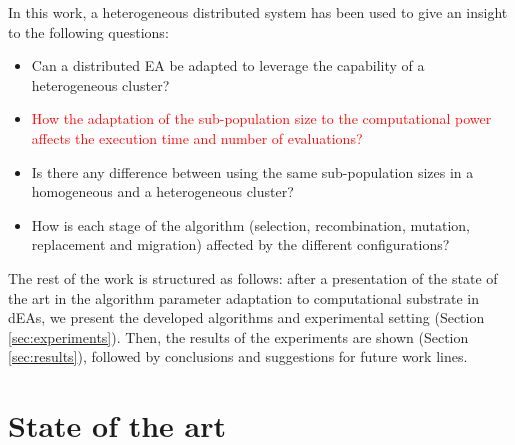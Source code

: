 \documentclass[final,1p,times]{elsarticle}
\begin{document}
In this work, a heterogeneous distributed system has been used to give an insight to the following questions:
\begin{itemize}
 \item Can a distributed EA be adapted to leverage the capability of a
   heterogeneous cluster? %
 \item \textcolor{red}{How the adaptation of the sub-population size to the computational power affects the execution time and number of evaluations?} %
 \item Is there any difference between using the same sub-population sizes in a homogeneous and a heterogeneous cluster?
 \item How is each stage of the algorithm (selection, recombination, mutation, replacement and migration) affected by the different
   configurations? %
\end{itemize}


The rest of the work is structured as follows: after a presentation of
the state of
the art in the algorithm parameter adaptation to computational substrate in dEAs, %
 we present the developed algorithms and experimental setting (Section \ref{sec:experiments}). 
Then, the results of the experiments are shown (Section \ref{sec:results}), followed by conclusions and suggestions for future work lines.


%
\section{State of the art}
\label{sec:soa}
\end{document}
